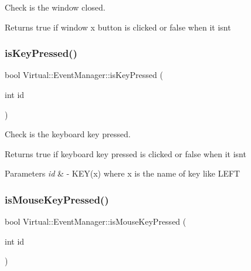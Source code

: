 Check is the window closed. 

\begin{DoxyReturn}{Returns}
true if window x button is clicked or false when it isn\textquotesingle{}t 
\end{DoxyReturn}
\hypertarget{class_virtual_1_1_event_manager_a565bd5f26862a9f8f102078df1cfa39c}{}\label{class_virtual_1_1_event_manager_a565bd5f26862a9f8f102078df1cfa39c} 
\subsubsection{\texorpdfstring{is\+Key\+Pressed()}{isKeyPressed()}}
{\footnotesize\ttfamily bool Virtual\+::\+Event\+Manager\+::is\+Key\+Pressed (\begin{DoxyParamCaption}\item[{int}]{id }\end{DoxyParamCaption})}



Check is the keyboard key pressed. 

\begin{DoxyReturn}{Returns}
true if keyboard key pressed is clicked or false when it isn\textquotesingle{}t
\end{DoxyReturn}

\begin{DoxyParams}{Parameters}
{\em id} & -\/ K\+E\+Y(x) where x is the name of key like L\+E\+FT \\
\hline
\end{DoxyParams}
\hypertarget{class_virtual_1_1_event_manager_addd617c04422d16843073acc9b8a6d32}{}\label{class_virtual_1_1_event_manager_addd617c04422d16843073acc9b8a6d32} 
\subsubsection{\texorpdfstring{is\+Mouse\+Key\+Pressed()}{isMouseKeyPressed()}}
{\footnotesize\ttfamily bool Virtual\+::\+Event\+Manager\+::is\+Mouse\+Key\+Pressed (\begin{DoxyParamCaption}\item[{int}]{id }\end{DoxyParamCaption})}



